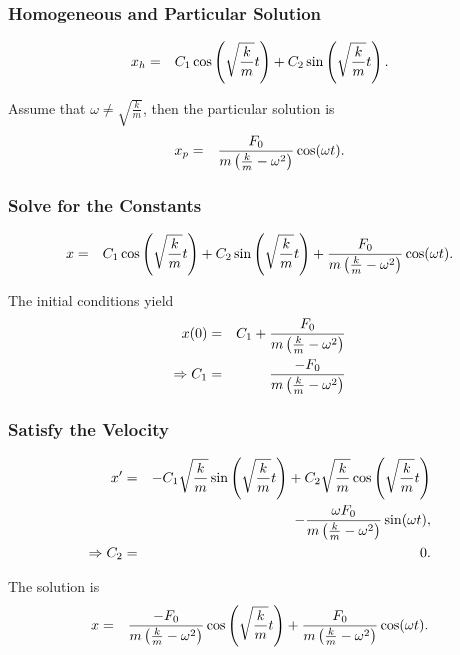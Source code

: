 \begin{frame}
  \frametitle{Homogeneous and Particular Solution}

  \begin{eqnarray*}
    x_h & = & C_1 \cos\left(\sqrt{\frac{k}{m}}t\right) + C_2 \sin\left(\sqrt{\frac{k}{m}}t\right).
  \end{eqnarray*}

  Assume that $\omega \neq \sqrt{\frac{k}{m}}$, then the particular
  solution is
  \begin{eqnarray*}
    x_p & = & \frac{F_0}{m\left(\frac{k}{m}-\omega^2\right)} \cos(\omega t).
  \end{eqnarray*}

\end{frame}


\begin{frame}
  \frametitle{Solve for the Constants}

  \begin{eqnarray*}
    x & = & C_1 \cos\left(\sqrt{\frac{k}{m}}t\right) + C_2 \sin\left(\sqrt{\frac{k}{m}}t\right)+ 
           \frac{F_0}{m\left(\frac{k}{m}-\omega^2\right)} \cos(\omega t).
  \end{eqnarray*}

  The initial conditions yield
  \begin{eqnarray*}
    x(0) & = & C_1 + \frac{F_0}{m\left(\frac{k}{m}-\omega^2\right)} \\
    \Rightarrow C_1 & = & \frac{-F_0}{m\left(\frac{k}{m}-\omega^2\right)}
  \end{eqnarray*}

\end{frame}


\begin{frame}
  \frametitle{Satisfy the Velocity}

  \begin{eqnarray*}
    x' & = & - C_1 \sqrt{\frac{k}{m}} \sin\left(\sqrt{\frac{k}{m}}t\right) + C_2 \sqrt{\frac{k}{m}} \cos\left(\sqrt{\frac{k}{m}}t\right) \\ 
    & & - \frac{\omega F_0}{m\left(\frac{k}{m}-\omega^2\right)} \sin(\omega t), \\
    \Rightarrow C_2 & = & 0.
  \end{eqnarray*}

  The solution is 
  \begin{eqnarray*}
    x & = & \frac{-F_0}{m\left(\frac{k}{m}-\omega^2\right)} \cos\left(\sqrt{\frac{k}{m}}t\right) 
    + \frac{F_0}{m\left(\frac{k}{m}-\omega^2\right)} \cos(\omega t).
  \end{eqnarray*}


\end{frame}


